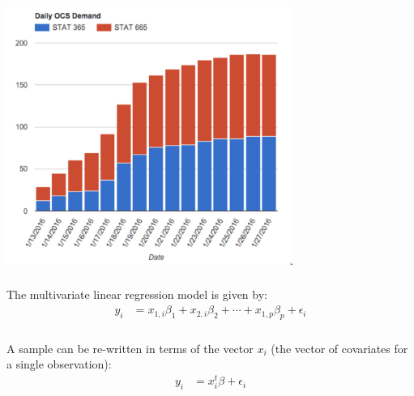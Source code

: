 \documentclass[xetex,mathserif,serif,aspectratio=169]{beamer}
\begin{document}
\begin{frame}[fragile] \frametitle{} \oldB \small

\begin{center}
\includegraphics[width=0.7\textwidth]{img/stat665.pdf}
\end{center}

\end{frame}

\begin{frame}[fragile] \frametitle{} \oldB \small

\textbf{}

The multivariate linear regression model is given by:
\begin{align*}
y_i &= x_{1,i} \beta_1 + x_{2,i} \beta_2 + \cdots + x_{1,p} \beta_p + \epsilon_i
\end{align*}

\end{frame}


\begin{frame}[fragile] \frametitle{} \oldB \small

A sample can be re-written in terms of the vector $x_i$
(the vector of covariates for a single observation):
\begin{align*}
y_i &= x_{i}^t \beta + \epsilon_i
\end{align*}

\end{frame}
\end{document}
